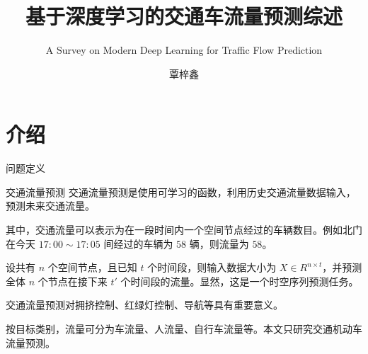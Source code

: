 \documentclass{libs/format}
\title[交通流量预测综述]{基于深度学习的交通车流量预测综述}
\subtitle{A Survey on Modern Deep Learning for Traffic Flow Prediction}
\institute[Sun Yat-Sen University]{\normalsize 中山大学人工智能学院}
\date[\ctoday]{\ctoday}
\begin{document}


\author[]{\large 覃梓鑫}

\begin{frame}
  \titlepage
\end{frame}


\section{介绍}

\begin{frame}{问题定义}
  \begin{block}{交通流量预测}
    交通流量预测是使用可学习的函数，利用历史交通流量数据输入，预测未来交通流量。\cite{T-ZS1}

    其中，交通流量可以表示为在一段时间内一个空间节点经过的车辆数目。例如北门在今天 $17:00\sim17:05$ 间经过的车辆为 $58$ 辆，则流量为 $58$。

    设共有 $n$ 个空间节点，且已知 $t$ 个时间段，则输入数据大小为 $X\in R^{n\times t}$，并预测全体 $n$ 个节点在接下来 $t'$ 个时间段的流量。显然，这是一个时空序列预测任务。

  \end{block}
  交通流量预测对拥挤控制、红绿灯控制、导航等具有重要意义。\cite{T-ZS2, T-ZS32}
  
  按目标类别，流量可分为车流量、人流量、自行车流量等。本文只研究交通机动车流量预测。
\end{frame}
\end{document}
